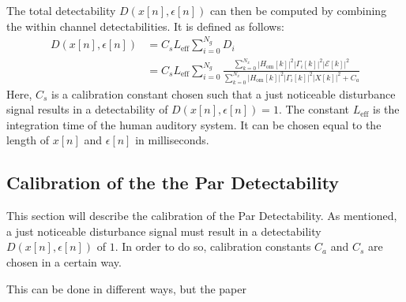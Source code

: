 The total detectability $D(x[n],\epsilon[n])$ can then be computed by combining the within channel detectabilities.
It is defined as follows:
\begin{align}
    D(x[n],\epsilon[n]) &= C_s L_\text{eff}\sum_{i=0}^{N_g} D_i \\
                        &= C_s L_\text{eff}\sum_{i=0}^{N_g} 
                        \frac{\sum_{k=0}^{N_x}\left|H_\text{om}[k]\right|^2\left|
                            \Gamma_i[k]\right|^2\left|\mathcal{E}[k]\right|^2}
                        {\sum_{k=0}^{N_x}\left|H_\text{om}[k]\right|^2\left|
                            \Gamma_i[k]\right|^2\left|X[k]\right|^2 + C_a}
\end{align}
Here, $C_s$ is a calibration constant chosen such that a just noticeable disturbance signal results in a 
detectability of $D(x[n],\epsilon[n]) = 1$. 
The constant $L_\text{eff}$ is the integration time of the human auditory system.
It can be chosen equal to the length of $x[n]$ and $\epsilon[n]$ in milliseconds.  

\subsection{Calibration of the the Par Detectability}
\label{ch:perceptual:implementation:calibration}
This section will describe the calibration of the Par Detectability.
As mentioned, a just noticeable disturbance signal must result in a detectability $D(x[n],\epsilon[n])$ of $1$.
In order to do so, calibration constants $C_a$ and $C_s$ are chosen in a certain way.

This can be done in different ways, but the paper~\cite{van2005perceptual} 
